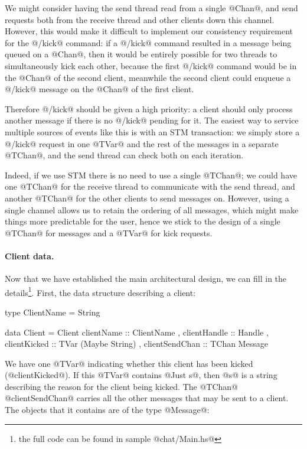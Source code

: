 We might consider having the send thread read from a single @Chan@,
and send requests both from the receive thread and other clients down
this channel.  However, this would make it difficult to implement our
consistency requirement for the @/kick@ command: if a @/kick@ command
resulted in a message being queued on a @Chan@, then it would be
entirely possible for two threads to simultaneously kick each other,
because the first @/kick@ command would be in the @Chan@ of the second
client, meanwhile the second client could enqueue a @/kick@ message on
the @Chan@ of the first client.

Therefore @/kick@ should be given a high priority: a client should
only process another message if there is no @/kick@ pending for it.
The easiest way to service multiple sources of events like this is
with an STM transaction: we simply store a @/kick@ request in one
@TVar@ and the rest of the messages in a separate @TChan@, and the
send thread can check both on each iteration.

Indeed, if we use STM there is no need to use a single @TChan@; we
could have one @TChan@ for the receive thread to communicate with the
send thread, and another @TChan@ for the other clients to send
messages on.  However, using a single channel allows us to retain the
ordering of all messages, which might make things more predictable for
the user, hence we stick to the design of a single @TChan@ for
messages and a @TVar@ for kick requests.

\paragraph{Client data.} Now that we have established the main architectural design, we can
fill in the details\footnote{the full code can be found in sample
  @chat/Main.hs@}.  First, the data structure describing a client:

\begin{haskell}
type ClientName = String

data Client = Client
  { clientName     :: ClientName
  , clientHandle   :: Handle
  , clientKicked   :: TVar (Maybe String)
  , clientSendChan :: TChan Message
  }
\end{haskell}

\noindent We have one @TVar@ indicating whether this client has been
kicked (@clientKicked@).  If this @TVar@ contains @Just s@, then @s@
is a string describing the reason for the client being kicked.  The
@TChan@ @clientSendChan@ carries all the other messages that may be
sent to a client.  The objects that it contains are of the type
@Message@:

